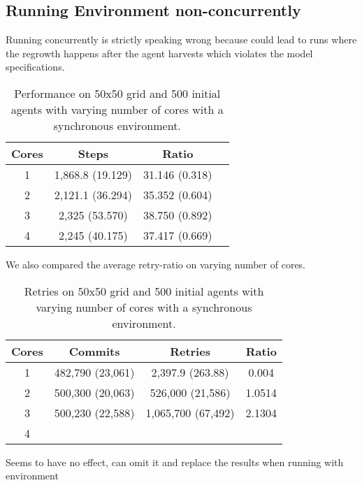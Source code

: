 \subsection{Running Environment non-concurrently}
Running concurrently is strictly speaking wrong because could lead to runs where the regrowth happens after the agent harvests which violates the model specifications. 

\begin{table}
	\centering
  	\begin{tabular}{ c || c | c | c }
        Cores & Steps            & Ratio           \\ \hline \hline 
    	1     & 1,868.8 (19.129) & 31.146 (0.318) \\ \hline
   		2     & 2,121.1 (36.294) & 35.352 (0.604) \\ \hline
   		3     & 2,325 (53.570)   & 38.750 (0.892) \\ \hline
   		4     & 2,245 (40.175)   & 37.417 (0.669) \\ \hline \hline
   	\end{tabular}
  	
  	\caption{Performance on 50x50 grid and 500 initial agents with varying number of cores with a synchronous environment.}
	\label{tab:naive_results_syncenv_time}
\end{table}

We also compared the average retry-ratio on varying number of cores.

\begin{table}
	\centering
  	\begin{tabular}{ c || c | c | c }
        Cores & Commits           & Retries            & Ratio \\ \hline \hline 
    	1     & 482,790 (23,061)  & 2,397.9 (263.88)   & 0.004 \\ \hline
   		2     & 500,300 (20,063)  & 526,000 (21,586)   & 1.0514 \\ \hline
   		3     & 500,230 (22,588)  & 1,065,700 (67,492) & 2.1304 \\ \hline
   		4     &                   &                    &  \\ \hline
   	\end{tabular}
  	
  	\caption{Retries on 50x50 grid and 500 initial agents with varying number of cores with a synchronous environment.}
	\label{tab:naive_results_syncenv_retries}
\end{table}

Seems to have no effect, can omit it and replace the results when running with environment 

